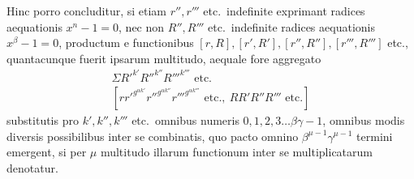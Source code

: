 Hinc porro concluditur, si etiam $r'',r'''$ etc.\ indefinite exprimant radices aequationis $x^n-1=0$, nec non $R'',R'''$ etc.\ indefinite radices aequationis $x^\beta-1=0$, productum e functionibus $[r,R],[r',R'],[r'',R''],[r''',R''']$ etc., quantacunque fuerit ipsarum multitudo, aequale fore aggregato
\[
\begin{gathered}
\Sigma R'^{k'}R''^{k''}R'''^{k'''}\text{ etc.}\\
{}[rr'^{g^{\alpha k'}}r''^{g^{\alpha k''}}r'''^{g^{\alpha k'''}}\text{ etc.},\ RR'R''R'''\text{ etc.}]
\end{gathered}
\]
substitutis pro $k',k'',k'''$ etc.\ omnibus numeris $0,1,2,3\ldots\beta\gamma-1$, omnibus modis diversis possibilibus inter se combinatis, quo pacto omnino $\beta^{\mu-1}\gamma^{\mu-1}$ termini emergent, si per $\mu$ multitudo illarum functionum inter se multiplicatarum denotatur.
